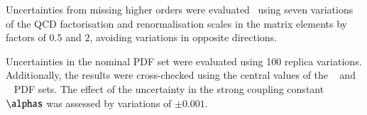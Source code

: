 Uncertainties from missing higher orders were
evaluated~\cite{Bothmann:2016nao} using seven variations of the QCD
factorisation and renormalisation scales in the matrix elements by
factors of $0.5$ and $2$, avoiding variations in opposite directions.

Uncertainties in the nominal PDF set were evaluated using 100 replica
variations. Additionally, the results were cross-checked using the
central values of the \CT[14nnlo]~\cite{Dulat:2015mca} and
\MMHT[nnlo]~\cite{Harland-Lang:2014zoa} PDF sets. The effect of the uncertainty 
in the strong coupling constant $\alphas$ was assessed by variations of $\pm 0.001$.




